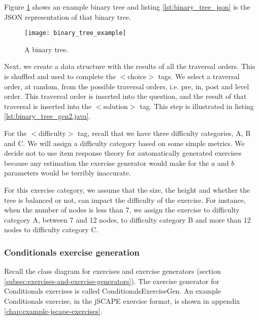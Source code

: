 Figure \ref{fig:binary_tree_example} shows an example binary tree and listing \ref{lst:binary_tree_json} is the JSON representation of that binary tree. 

\begin{figure}[H]
\centering
\texttt{[image: binary\_tree\_example]}
\caption{A binary tree.}
\label{fig:binary_tree_example}
\end{figure}



\newpage

Next, we create a data structure with the results of all the traversal orders. This is shuffled and used to complete the \textsf{$<$choice$>$} tags. We select a traversal order, at random, from the possible traversal orders, i.e. pre, in, post and level order. This traversal order is inserted into the question, and the result of that traversal is inserted into the \textsf{$<$solution$>$} tag. This step is illustrated in listing \ref{lst:binary_tree_gen2.java}. \newline



For the \textsf{$<$difficulty$>$} tag, recall that we have three difficulty categories, A, B and C. We will assign a difficulty category based on some simple metrics. We decide not to use item response theory for automatically generated exercises because any estimation the exercise generator would make for the $a$ and $b$ parameters would be terribly inaccurate.\newline

For this exercise category, we assume that the size, the height and whether the tree is balanced or not, can impact the difficulty of the exercise. For instance, when the number of nodes is less than 7, we assign the exercise to difficulty category A, between 7 and 12 nodes, to difficulty category B and more than 12 nodes to difficulty category C.

\subsubsection{Conditionals exercise generation}
Recall the class diagram for exercises and exercise generators (section \ref{subsec:exercises-and-exercise-generators}). The exercise generator for Conditionals exercises is called \textsf{ConditionalsExerciseGen}. An example Conditionals exercise, in the jSCAPE exercise format, is shown in appendix \ref{chap:example-jscape-exercises}.\newline

